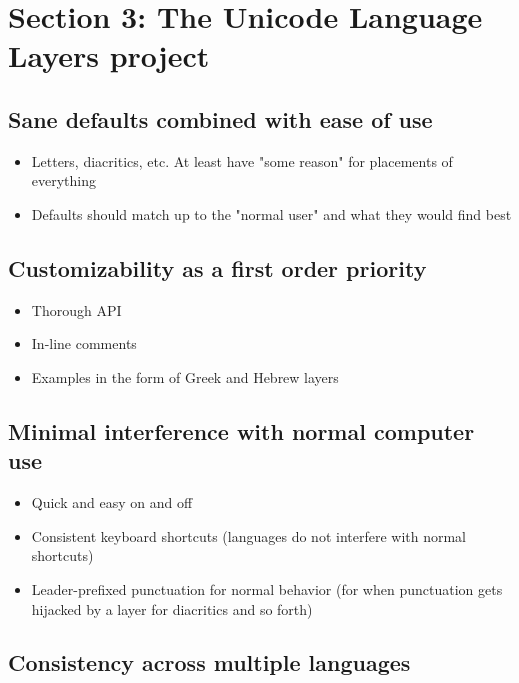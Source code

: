 \documentclass[11pt]{article}
\begin{document}
\section{Section 3: The Unicode Language Layers project}
\label{sec:org717035d}

\subsection{Sane defaults combined with ease of use}
\label{sec:orgeacee9a}

\begin{itemize}
\item Letters, diacritics, etc. At least have "some reason" for placements of everything
\item Defaults should match up to the "normal user" and what they would find best
\end{itemize}

\subsection{Customizability as a first order priority}
\label{sec:org6466d38}

\begin{itemize}
\item Thorough API
\item In-line comments
\item Examples in the form of Greek and Hebrew layers
\end{itemize}

\subsection{Minimal interference with normal computer use}
\label{sec:org6af3664}

\begin{itemize}
\item Quick and easy on and off
\item Consistent keyboard shortcuts (languages do not interfere with normal shortcuts)
\item Leader-prefixed punctuation for normal behavior (for when punctuation gets hijacked by a layer for diacritics and so forth)
\end{itemize}

\subsection{Consistency across multiple languages}
\label{sec:orge702336}
\end{document}

